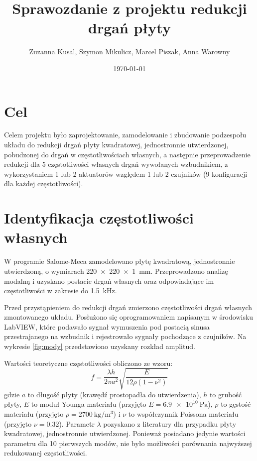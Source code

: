 \documentclass[polish,a4paper,11pt]{mwart}
\date{\today}
\author{Zuzanna Kusal, Szymon Mikulicz, Marcel Piszak, Anna Warowny}
\title{Sprawozdanie z projektu redukcji drgań płyty}
\let\Oldsection\section
\renewcommand{\section}{\FloatBarrier\Oldsection}
\begin{document}
\maketitle

\section{Cel}

Celem projektu było zaprojektowanie, zamodelowanie i zbudowanie podzespołu
układu do redukcji drgań płyty kwadratowej, jednostronnie utwierdzonej,
pobudzonej do drgań w częstotliwościach własnych, a następnie przeprowadzenie
redukcji dla 5 częstotliwości własnych drgań wywołanych wzbudnikiem, z
wykorzystaniem 1 lub 2 aktuatorów względem 1 lub 2 czujników (9 konfiguracji
dla każdej częstotliwości).

\section{Identyfikacja częstotliwości własnych} \label{ident}

W programie Salome-Meca zamodelowano płytę kwadratową, jednostronnie
utwierdzoną, o wymiarach \SI{220 x 220 x 1}{\milli\meter}. Przeprowadzono analizę
modalną i uzyskano postacie drgań własnych  oraz odpowiadające im
częstotliwości w zakresie do \SI{1.5}{\kilo\hertz}.

Przed przystąpieniem do redukcji drgań zmierzono częstotliwości drgań własnych
zmontowanego układu. Posłużono się oprogramowaniem napisanym w środowisku
LabVIEW\texttrademark, które podawało sygnał wymuszenia pod postacią sinusa
przestrajanego na wzbudnik i rejestrowało sygnały pochodzące z czujników. Na
wykresie \ref{fig:mody} przedstawiono uzyskany rozkład amplitud.

Wartości teoretyczne częstotliwości obliczono ze wzoru:
\begin{equation}
  f = \frac{\lambda h}{2 \pi a^2}\sqrt{\frac{E}{12 \rho \left( 1-\nu^2 \right)}}
\end{equation}
gdzie $a$ to długość płyty (krawędź prostopadła do utwierdzenia), $h$ to grubość
płyty, $E$ to moduł Younga materiału (przyjęto $E=\SI{6.9e10}{\pascal}$), $\rho$
to gęstość materiału (przyjęto $\rho=\SI{2700}{\kilogram\per\cubic\metre}$) i
$\nu$ to współczynnik Poissona materiału (przyjęto $\nu =\num{0.32}$). Parametr
$\lambda$ pozyskano z literatury \cite{Leissa}
dla przypadku płyty kwadratowej, jednostronnie utwierdzonej. Ponieważ posiadano
jedynie wartości parametru dla 10 pierwszych modów, nie było możliwości
porównania najwyższej redukowanej częstotliwości. 
\end{document}
